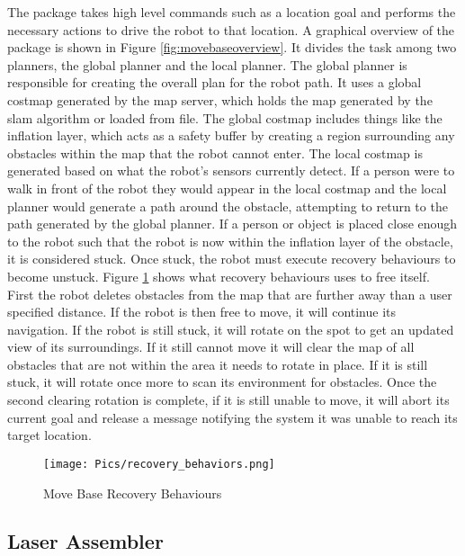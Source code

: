 The  package takes high level commands such as a location goal and performs the necessary actions to drive the robot to that location. A graphical overview of the package is shown in Figure \ref{fig:movebaseoverview}. It divides the task among two planners, the global planner and the local planner. The global planner is responsible for creating the overall plan for the robot path. It uses a global costmap generated by the map server, which holds the map generated by the \acrshort{slam} algorithm or loaded from file. The global costmap includes things like the inflation layer, which acts as a safety buffer by creating a region surrounding any obstacles within the map that the robot cannot enter. The local costmap is generated based on what the robot's sensors currently detect. If a person were to walk in front of the robot they would appear in the local costmap and the local planner would generate a path around the obstacle, attempting to return to the path generated by the global planner. If a person or object is placed close enough to the robot such that the robot is now within the inflation layer of the obstacle, it is considered stuck. Once stuck, the robot must execute recovery behaviours to become unstuck. Figure \ref{fig:recovery} shows what recovery behaviours  uses to free itself. First the robot deletes obstacles from the map that are further away than a user specified distance. If the robot is then free to move, it will continue its navigation. If the robot is still stuck, it will rotate on the spot to get an updated view of its surroundings. If it still cannot move it will clear the map of all obstacles that are not within the area it needs to rotate in place. If it is still stuck, it will rotate once more to scan its environment for obstacles. Once the second clearing rotation is complete, if it is still unable to move, it will abort its current goal and release a message notifying the system it was unable to reach its target location.\\

\begin{figure}[H]
    \centering
    \texttt{[image: Pics/recovery\_behaviors.png]}
    \caption{Move Base Recovery Behaviours \cite{rosmovebase}}
    \label{fig:recovery}
\end{figure}

\subsection{Laser Assembler}


